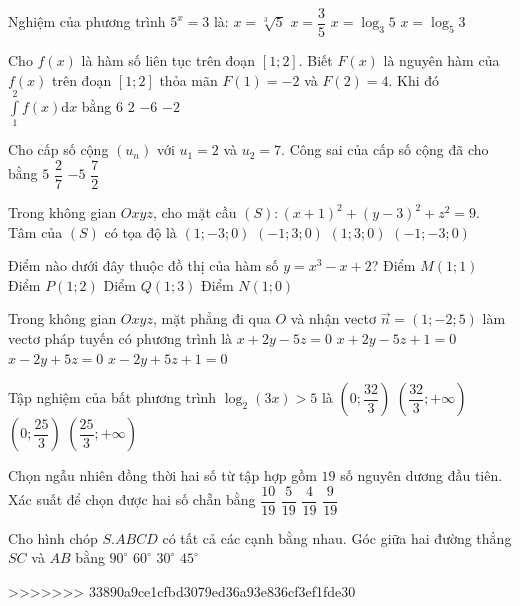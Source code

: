 \begin{ex}%
Nghiệm của phương trình $5^{x}=3$ là:
\choice
{$x=\sqrt[3]{5}$}
{$x=\dfrac{3}{5}$}
{$x=\log_3 5$}
{\True $x=\log_5 3$}

\end{ex}
\begin{ex}%
Cho $f(x)$ là hàm số liên tục trên đoạn $[1; 2]$. Biết $F(x)$ là nguyên hàm của $f(x)$ trên đoạn $[1; 2]$ thỏa mãn $F(1)=-2$ và $F(2)=4$. Khi đó $\displaystyle\int\limits_1^2 f(x) \mathrm{d} x$ bằng
\choice
{\True $6$}
{$2$}
{$-6$}
{$-2$}

\end{ex}
\begin{ex}%
Cho cấp số cộng $\left(u_n\right)$ với $u_1=2$ và $u_2=7$. Công sai của cấp số cộng đã cho bằng
\choice
{\True $5$}
{$\dfrac{2}{7}$}
{$-5$}
{$\dfrac{7}{2}$}

\end{ex}
\begin{ex}%
Trong không gian $O x y z$, cho mặt cầu $(S)\colon(x+1)^2+(y-3)^2+z^2=9$. Tâm của $(S)$ có tọa độ là
\choice
{$(1;-3; 0)$}
{\True $(-1; 3; 0)$}
{$(1; 3; 0)$}
{$(-1;-3; 0)$}

\end{ex}
\begin{ex}%
Điểm nào dưới đây thuộc đồ thị của hàm số $y=x^3-x+2$?
\choice
{Điểm $M(1; 1)$}
{\True Điểm $P(1; 2)$}
{Diểm $Q(1; 3)$}
{Điểm $N(1; 0)$}

\end{ex}
\begin{ex}%
Trong không gian $O x y z$, mặt phẳng đi qua $O$ và nhận vectơ $\vec{n}=(1;-2; 5)$ làm vectơ pháp tuyến có phương trình là
\choice
{$x+2 y-5 z=0$}
{$x+2 y-5 z+1=0$}
{\True $x-2 y+5 z=0$}
{$x-2 y+5 z+1=0$}

\end{ex}
\begin{ex}%
Tập nghiệm của bất phương trình $\log_2(3 x)>5$ là
\choice
{$\left(0; \dfrac{32}{3}\right)$}
{\True $\left(\dfrac{32}{3};+\infty\right)$}
{$\left(0; \dfrac{25}{3}\right)$}
{$\left(\dfrac{25}{3};+\infty\right)$}

\end{ex}
\begin{ex}%
Chọn ngẫu nhiên đồng thời hai số từ tập hợp gồm $19$ số nguyên dương đầu tiên. Xác suất để chọn được hai số chẵn bằng
\choice
{$\dfrac{10}{19}$}
{$\dfrac{5}{19}$}
{\True $\dfrac{4}{19}$}
{$\dfrac{9}{19}$}

\end{ex}
\begin{ex}%
Cho hình chóp $S.ABCD$ có tất cả các cạnh bằng nhau. Góc giữa hai đường thẳng $SC$ và $AB$ bằng
\choice
{$90^{\circ}$}
{\True $60^{\circ}$}
{$30^{\circ}$}
{$45^{\circ}$}

\end{ex}

>>>>>>> 33890a9ce1cfbd3079ed36a93e836cf3ef1fde30
